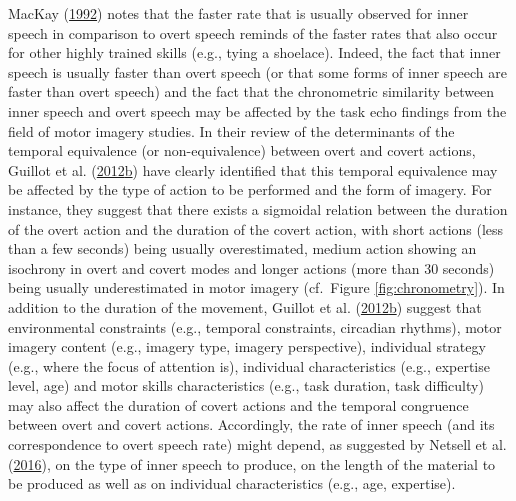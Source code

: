 \documentclass[a4paper,12pt,twoside,onecolumn,openright,final,oldfontcommands]{memoir}
\begin{document}
MacKay (\protect\hyperlink{ref-mackay_constraints_1992}{1992}) notes that the faster rate that is usually observed for inner speech in comparison to overt speech reminds of the faster rates that also occur for other highly trained skills (e.g., tying a shoelace). Indeed, the fact that inner speech is usually faster than overt speech (or that some forms of inner speech are faster than overt speech) and the fact that the chronometric similarity between inner speech and overt speech may be affected by the task echo findings from the field of motor imagery studies. In their review of the determinants of the temporal equivalence (or non-equivalence) between overt and covert actions, Guillot et al. (\protect\hyperlink{ref-guillot_understanding_2012}{2012}\protect\hyperlink{ref-guillot_understanding_2012}{b}) have clearly identified that this temporal equivalence may be affected by the type of action to be performed and the form of imagery. For instance, they suggest that there exists a sigmoidal relation between the duration of the overt action and the duration of the covert action, with short actions (less than a few seconds) being usually overestimated, medium action showing an isochrony in overt and covert modes and longer actions (more than 30 seconds) being usually underestimated in motor imagery (cf.~Figure \ref{fig:chronometry}). In addition to the duration of the movement, Guillot et al. (\protect\hyperlink{ref-guillot_understanding_2012}{2012}\protect\hyperlink{ref-guillot_understanding_2012}{b}) suggest that environmental constraints (e.g., temporal constraints, circadian rhythms), motor imagery content (e.g., imagery type, imagery perspective), individual strategy (e.g., where the focus of attention is), individual characteristics (e.g., expertise level, age) and motor skills characteristics (e.g., task duration, task difficulty) may also affect the duration of covert actions and the temporal congruence between overt and covert actions. Accordingly, the rate of inner speech (and its correspondence to overt speech rate) might depend, as suggested by Netsell et al. (\protect\hyperlink{ref-netsell_rate_2016}{2016}), on the type of inner speech to produce, on the length of the material to be produced as well as on individual characteristics (e.g., age, expertise).
\end{document}
